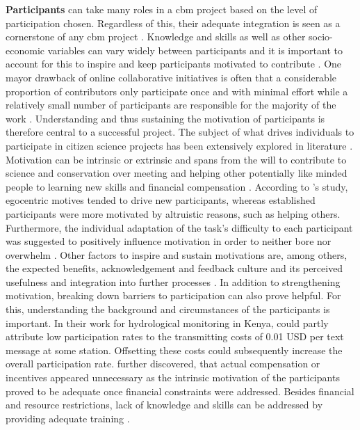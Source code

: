 \textbf{Participants} can take many roles in a \acrshort{cbm} project based on the level of participation chosen. Regardless of this, their adequate integration is seen as a cornerstone of any \acrshort{cbm} project \autocite{land-zandstraParticipantsCitizenScience2021}. Knowledge and skills as well as other socio-economic variables can vary widely between participants and it is important to account for this to inspire and keep participants motivated to contribute \autocite{minkmanCitizenScienceWater2015,whitelawEstablishingCanadianCommunity2003}. One mayor drawback of online collaborative initiatives is often that a considerable proportion of contributors only participate once and with minimal effort while a relatively small number of participants are responsible for the majority of the work \autocite{sauermannCrowdScienceUser2015}. Understanding and thus sustaining the motivation of participants is therefore central to a successful project. The subject of what drives individuals to participate in citizen science projects has been extensively explored in literature \autocite{land-zandstraParticipantsCitizenScience2021,minkmanCitizenScienceWater2015,mloza-bandaCrowdsensingSuccessfulWater2018,ruttenHowGetKeep2017,tipaldoCitizenScienceCommunitybased2017,walkerBenefitsNegativeImpacts2021}. Motivation can be intrinsic or extrinsic and spans from the will to contribute to science and conservation over meeting and helping other potentially like minded people to learning new skills and financial compensation \autocite{minkmanCitizenScienceWater2015,rotmanDynamicChangesMotivation2012,ruttenHowGetKeep2017}. According to \autocite{rotmanDynamicChangesMotivation2012}'s study, egocentric motives tended to drive new participants, whereas established participants were more motivated by altruistic reasons, such as helping others. Furthermore, the individual adaptation of the task's difficulty to each participant was suggested to positively influence motivation in order to neither bore nor overwhelm \autocite{minkmanCitizenScienceWater2015}. Other factors to inspire and sustain motivations are, among others, the expected benefits, acknowledgement and feedback culture and its perceived usefulness and integration into further processes \autocite{land-zandstraParticipantsCitizenScience2021,minkmanCitizenScienceWater2015,pettiboneCitizenScienceAll2016}. In addition to strengthening motivation, breaking down barriers to participation can also prove helpful. For this, understanding the background and circumstances of the participants is important. In their work for hydrological monitoring in Kenya, \autocite{weeserCitizenSciencePioneers2018a} could partly attribute low participation rates to the transmitting costs of 0.01 USD per text message at some station. Offsetting these costs could subsequently increase the overall participation rate. \autocite{weeserCitizenSciencePioneers2018a} further discovered, that actual compensation or incentives appeared unnecessary as the intrinsic motivation of the participants proved to be adequate once financial constraints were addressed. Besides financial and resource restrictions, lack of knowledge and skills can be addressed by providing adequate training \autocite{fraislCitizenScienceEnvironmental2022,lackstromBackyardHydroclimatologyCitizen2022}.

